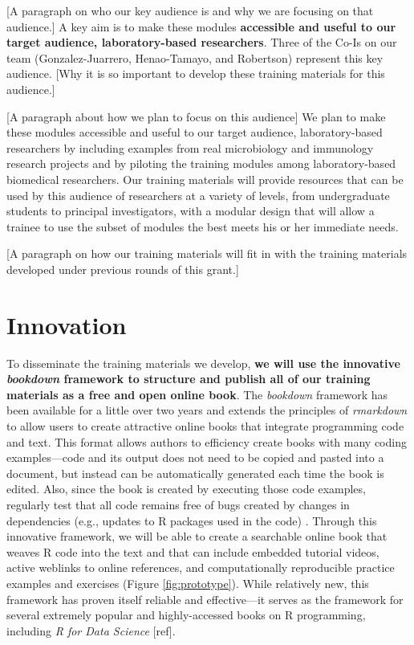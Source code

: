 \documentclass[pdftex,english,11pt,parskip=half]{scrartcl}
\begin{document}
[A paragraph on who our key audience is and why we are focusing on that
audience.] A key aim is to make these modules \textbf{accessible and useful to
our target audience, laboratory-based researchers}. Three of the Co-Is on our
team (Gonzalez-Juarrero, Henao-Tamayo, and Robertson) represent this key
audience. [Why it is so important to develop these training materials for this
audience.]

[A paragraph about how we plan to focus on this audience] We plan to make these
modules accessible and useful to our target audience, laboratory-based
researchers by including examples from real microbiology and immunology research
projects and by piloting the training modules among laboratory-based biomedical
researchers. Our training materials will provide resources that can be used by
this audience of researchers at a variety of levels, from undergraduate students
to principal investigators, with a modular design that will allow a trainee to
use the subset of modules the best meets his or her immediate needs.

[A paragraph on how our training materials will fit in with the training
materials developed under previous rounds of this grant.]

\section{Innovation} \vspace{-0.1in}

To disseminate the training materials we develop, \textbf{we will use the
innovative \textit{bookdown} framework \cite{xie2016bookdown} to structure and
publish all of our training materials as a free and open online book}. The
\textit{bookdown} framework has been available for a little over two years and
extends the principles of \textit{rmarkdown} to allow users to create attractive
online books that integrate programming code and text. This format allows
authors to efficiency create books with many coding examples---code and its
output does not need to be copied and pasted into a document, but instead can be
automatically generated each time the book is edited. Also, since the book is
created by executing those code examples, regularly test that all code remains
free of bugs created by changes in dependencies (e.g., updates to R packages
used in the code) \cite{xie2016bookdown}. Through this innovative framework, we
will be able to create a searchable online book that weaves R code into the text
and that can include embedded tutorial videos, active weblinks to online
references, and computationally reproducible practice examples and exercises
(Figure \ref{fig:prototype}). While relatively new, this framework has proven
itself reliable and effective---it serves as the framework for several extremely
popular and highly-accessed books on R programming, including \textit{R for Data
Science} [ref]. 
\end{document}

